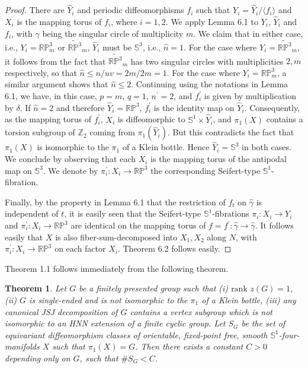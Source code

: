 \documentclass[11pt]{amsart}
\theoremstyle{plain}
\newtheorem{theorem}{Theorem}
\numberwithin{theorem}{section}
\theoremstyle{definition}
\begin{document}
\begin{proof}
There are $\hat{Y}_i$ and periodic diffeomorphisms $f_i$ such that $Y_i=\hat{Y}_i/\langle
f_i\rangle$ and $X_i$ is the mapping torus of $f_i$, where $i=1,2$. 
We apply Lemma 6.1 to $Y_i$, $\hat{Y}_i$ and $f_i$, with $\gamma$ being the singular 
circle of multiplicity $m$. We claim that in either case, i.e., $Y_i={{\mathbb R}}{{\mathbb P}}^3_m$ or 
$\widetilde{{{\mathbb R}}{{\mathbb P}}^3}_m$, $\hat{Y}_i$ must be ${{\mathbb S}}^3$, i.e., $\hat{n}=1$. For the case where
$Y_i=\widetilde{{{\mathbb R}}{{\mathbb P}}^3}_m$, it follows from the fact that $\widetilde{{{\mathbb R}}{{\mathbb P}}^3}_m$
has two singular circles with multiplicities $2,m$ respectively, so that $\hat{n}\leq n/uv=2m/2m=1$.
For the case where $Y_i={{\mathbb R}}{{\mathbb P}}^3_m$, a similar argument shows that $\hat{n}\leq 2$. 
Continuing using the notations in Lemma 6.1, we have, in this case, $p=m$, $q=1$, 
$n^\prime=2$, and $f_i^\prime$ is given by multiplication by $\delta$. If $\hat{n}=2$ and 
therefore $\hat{Y}_i={{\mathbb R}}{{\mathbb P}}^3$, $f_i^\prime$ is the identity map on $\hat{Y}_i$.
Consequently, as the mapping torus of $f_i^\prime$, $X_i$ is diffeomorphic to
${{\mathbb S}}^1\times \hat{Y}_i$, and $\pi_1(X)$ contains a torsion subgroup of ${{\mathbb Z}}_2$ coming 
from $\pi_1(\hat{Y}_i)$. But this contradicts the fact that $\pi_1(X)$ is isomorphic to the 
$\pi_1$ of a Klein bottle. Hence $\hat{Y}_i={{\mathbb S}}^3$ in both cases. We conclude by observing 
that each $X_i$ is the mapping torus of the antipodal map on ${{\mathbb S}}^3$. We denote by
$\pi_i^\prime: X_i\rightarrow {{\mathbb R}}{{\mathbb P}}^3$ the corresponding Seifert-type ${{\mathbb S}}^1$-fibration. 

Finally, by the property in Lemma 6.1 that the restriction of $f_t$ on $\hat{\gamma}$ is independent 
of $t$, it is easily seen that the Seifert-type ${{\mathbb S}}^1$-fibrations $\pi_i:X_i\rightarrow Y_i$ and 
$\pi_i^\prime: X_i\rightarrow {{\mathbb R}}{{\mathbb P}}^3$ are identical on
the mapping torus of $f=f^\prime: \hat{\gamma}\rightarrow \hat{\gamma}$. It follows easily
that $X$ is also fiber-sum-decomposed into $X_1,X_2$ along $N$, with $\pi_i^\prime: 
X_i\rightarrow {{\mathbb R}}{{\mathbb P}}^3$ on each factor $X_i$. Theorem 6.2 follows easily. 

\end{proof}

Theorem 1.1 follows immediately from the following theorem. 

\begin{theorem}
Let $G$ be a finitely presented group such that (i) $\text{rank }z(G)=1$, (ii)
$G$ is single-ended and is not isomorphic to the $\pi_1$ of 
a Klein bottle, (iii) any canonical JSJ decomposition of $G$ contains a vertex 
subgroup which is not isomorphic to an HNN extension of a finite cyclic group.
Let $S_G$ be the set of equivariant diffeomorphism classes of orientable, fixed-point free,
smooth ${{\mathbb S}}^1$-four-manifolds $X$ such that $\pi_1(X)=G$. Then there exists a constant
$C>0$ depending only on $G$, such that $\# S_G<C$.
\end{theorem}
\end{document}
